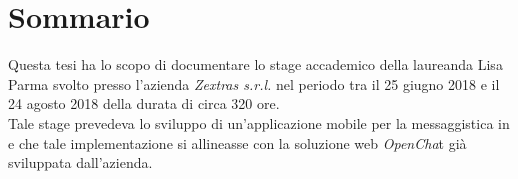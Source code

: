 \cleardoublepage
{}
\chapter*{Sommario}
Questa tesi ha lo scopo di documentare lo stage accademico della laureanda Lisa Parma svolto presso l'azienda \emph{Zextras s.r.l.} nel periodo tra il 25 giugno 2018 e il 24 agosto 2018 della durata di circa 320 ore.\\ 
 Tale stage prevedeva lo sviluppo di un'applicazione mobile  per la 
 messaggistica in  e che tale implementazione si allineasse con la soluzione web \emph{OpenCha}t già  sviluppata dall'azienda.

\thispagestyle{empty}



\bigskip

